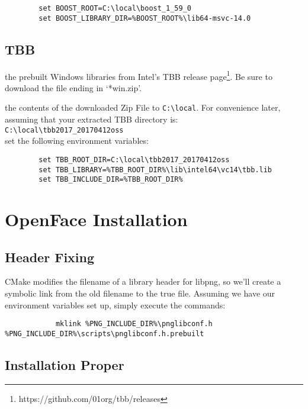 \documentclass{tufte-handout}
\begin{document}
    \begin{lstlisting}
        set BOOST_ROOT=C:\local\boost_1_59_0
        set BOOST_LIBRARY_DIR=%BOOST_ROOT%\lib64-msvc-14.0
    \end{lstlisting}

\subsection{TBB}

     the prebuilt Windows libraries from Intel's TBB release 
    page\footnote{https://github.com/01org/tbb/releases}.  Be sure to download the file ending
    in `*win.zip'.

     the contents of the downloaded Zip File to \Verb|C:\local|.  For
    convenience later, assuming that your extracted TBB directory is: \\
    \Verb|C:\local\tbb2017_20170412oss| \\
    set the following environment variables:

    \begin{lstlisting}
        set TBB_ROOT_DIR=C:\local\tbb2017_20170412oss
        set TBB_LIBRARY=%TBB_ROOT_DIR%\lib\intel64\vc14\tbb.lib
        set TBB_INCLUDE_DIR=%TBB_ROOT_DIR%
    \end{lstlisting}
        
\section{OpenFace Installation}

    \subsection{Header Fixing}
        
        CMake modifies the filename of a library header for libpng, so we'll
        create a symbolic link from the old filename to the true file.
        Assuming we have our environment variables set up, simply execute the
        commands:

        \begin{lstlisting}
            mklink %PNG_INCLUDE_DIR%\pnglibconf.h %PNG_INCLUDE_DIR%\scripts\pnglibconf.h.prebuilt
        \end{lstlisting}

    \subsection{Installation Proper}
\end{document}
